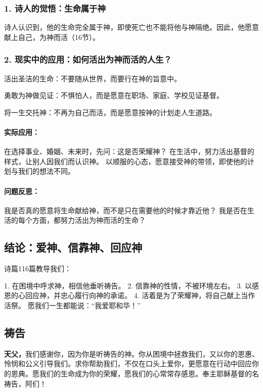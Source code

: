 \documentclass[a4paper, 12pt]{article}
\begin{document}
\subsubsection*{1. 诗人的觉悟：生命属于神}
诗人认识到，他的生命完全属于神，即使死亡也不能将他与神隔绝。因此，他愿意献上自己，为神而活（16节）。

\subsubsection*{2. 现实中的应用：如何活出为神而活的人生？}

\hspace{0.6cm}活出圣洁的生命：不要随从世界，而要行在神的旨意中。

勇敢为神做见证：不惧怕人，而是愿意在职场、家庭、学校见证基督。

将一生交托神：不再为自己而活，而是愿意按神的计划走人生道路。
\paragraph*{实际应用：}

在选择事业、婚姻、未来时，先问：这是否荣耀神？
在生活中，努力活出基督的样式，让别人因我们而认识神。
以顺服的心态，愿意接受神的带领，即使他的计划与我们的想法不同。
\paragraph*{问题反思：}

我是否真的愿意将生命献给神，而不是只在需要他的时候才靠近他？
我是否在生活的每个方面，都努力活出为神而活的生命？
\subsection*{结论：爱神、信靠神、回应神}
诗篇116篇教导我们：

1. 在困境中呼求神，相信他垂听祷告。
2. 信靠神的性情，不被环境左右。
3. 以感恩的心回应神，并忠心履行向神的承诺。
4. 活着是为了荣耀神，将自己献上当作活祭。
愿我们一生都能说：“我爱耶和华！”

\subsection*{祷告}
\textbf{天父，}我们感谢你，因为你是听祷告的神。你从困境中拯救我们，又以你的恩惠、怜悯和公义引导我们。求你帮助我们，不仅在口头上爱你，更愿意在行动中回应你的恩典。愿我们的生命成为你的荣耀，愿我们的心常常存感恩。奉主耶稣基督的名祷告，阿们！
\newpage
\end{document}

